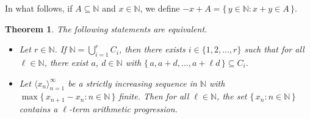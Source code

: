 \documentclass[12pt]{article}
\theoremstyle{plain}
\newtheorem{thm}{Theorem}[section]
\theoremstyle{definition}
\newcommand{\la}{\langle}
\newcommand{\ra}{\rangle}
\newcommand{\bbN}{\mathbb{N}}
\begin{document}
In what follows, if $A \subseteq \bbN$ and $x \in \bbN$, we define $-x
+ A = \{\, y \in \bbN : x + y \in A \,\}$.

\begin{thm}
  \label{thm:vdwEqSyn}
  The following statements are equivalent.
  \begin{itemize}
    \item[(a)] Let $r \in \bbN$.
      If $\bbN = \bigcup_{i=1}^r C_i$, then there exists $i \in \{1, 2,
      \ldots, r\}$ such that for all $\ell \in \bbN$, there exist $a$,
      $d \in \bbN$ with $\{\, a, a+d, \ldots, a+\ell d \,\} \subseteq
      C_i$. 

    \item[(b)] Let $\la x_n \ra_{n=1}^\infty$ be a strictly increasing
      sequence in $\bbN$ with $\max\{\, x_{n+1} - x_n : n \in \bbN
      \,\}$ finite.
      Then for all $\ell \in \bbN$, the set $\{\, x_n : n \in \bbN
      \,\}$ contains a \mbox{$\ell$-term} arithmetic progression.
  \end{itemize}
\end{thm}
\end{document}
